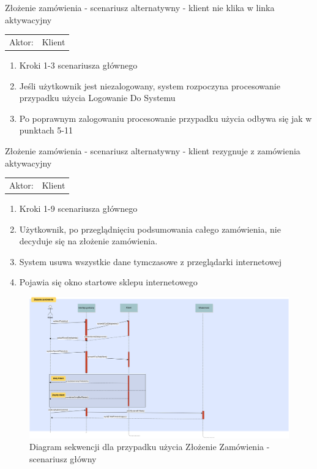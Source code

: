   
  \item Złożenie zamówienia - scenariusz alternatywny - klient nie klika w linka
aktywacyjny
   \begin{tabularx}{\linewidth}{ c X}
	Aktor: & Klient \\
  	\end{tabularx}   
  	\begin{enumerate}
  	  \item Kroki 1-3 scenariusza głównego
  	  \item Jeśli użytkownik jest niezalogowany, system rozpoczyna procesowanie
  	  przypadku użycia Logowanie Do Systemu
  	  \item Po poprawnym zalogowaniu procesowanie przypadku użycia odbywa się jak
  	  w punktach 5-11
  	\end{enumerate}
  	
  	
  	\item Złożenie zamówienia - scenariusz alternatywny - klient rezygnuje z
  	zamówienia aktywacyjny
   \begin{tabularx}{\linewidth}{ c X}
	Aktor: & Klient \\
  	\end{tabularx}   
  	\begin{enumerate}
  	  \item Kroki 1-9 scenariusza głównego
  	  \item Użytkownik, po przeglądnięciu podsumowania całego zamówienia, nie
  	  decyduje się na złożenie zamówienia.
  	  \item System usuwa wszystkie dane tymczasowe z przeglądarki internetowej
  	  \item Pojawia się okno startowe sklepu internetowego
  	\end{enumerate}
  	
  	
   	
\begin{figure}[H]
    \includegraphics[width=\textwidth,
    height=0.5\textheight]{graphics/UseCase/Klient/ZlozenieZamowieniaSD.png}
  \caption{Diagram sekwencji dla przypadku użycia Złożenie Zamówienia -
  scenariusz główny}
\end{figure}